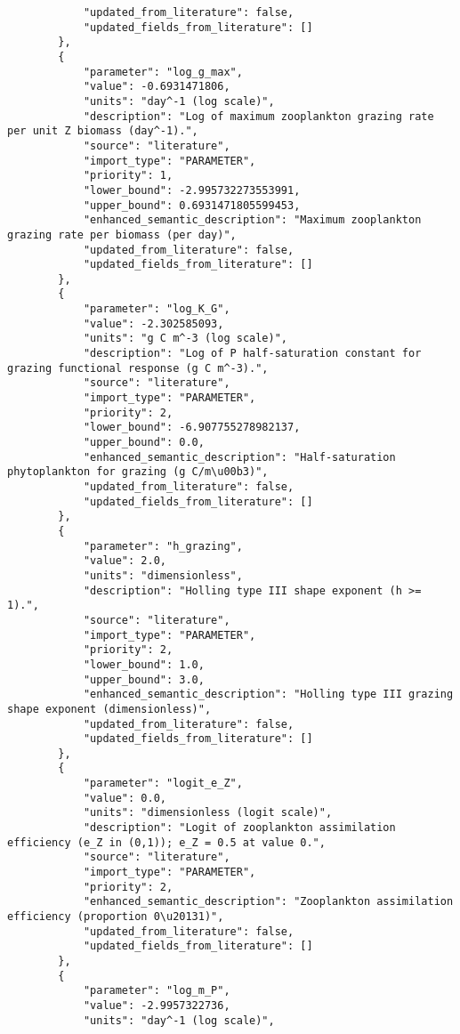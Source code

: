 \begin{lstlisting}
            "updated_from_literature": false,
            "updated_fields_from_literature": []
        },
        {
            "parameter": "log_g_max",
            "value": -0.6931471806,
            "units": "day^-1 (log scale)",
            "description": "Log of maximum zooplankton grazing rate per unit Z biomass (day^-1).",
            "source": "literature",
            "import_type": "PARAMETER",
            "priority": 1,
            "lower_bound": -2.995732273553991,
            "upper_bound": 0.6931471805599453,
            "enhanced_semantic_description": "Maximum zooplankton grazing rate per biomass (per day)",
            "updated_from_literature": false,
            "updated_fields_from_literature": []
        },
        {
            "parameter": "log_K_G",
            "value": -2.302585093,
            "units": "g C m^-3 (log scale)",
            "description": "Log of P half-saturation constant for grazing functional response (g C m^-3).",
            "source": "literature",
            "import_type": "PARAMETER",
            "priority": 2,
            "lower_bound": -6.907755278982137,
            "upper_bound": 0.0,
            "enhanced_semantic_description": "Half-saturation phytoplankton for grazing (g C/m\u00b3)",
            "updated_from_literature": false,
            "updated_fields_from_literature": []
        },
        {
            "parameter": "h_grazing",
            "value": 2.0,
            "units": "dimensionless",
            "description": "Holling type III shape exponent (h >= 1).",
            "source": "literature",
            "import_type": "PARAMETER",
            "priority": 2,
            "lower_bound": 1.0,
            "upper_bound": 3.0,
            "enhanced_semantic_description": "Holling type III grazing shape exponent (dimensionless)",
            "updated_from_literature": false,
            "updated_fields_from_literature": []
        },
        {
            "parameter": "logit_e_Z",
            "value": 0.0,
            "units": "dimensionless (logit scale)",
            "description": "Logit of zooplankton assimilation efficiency (e_Z in (0,1)); e_Z = 0.5 at value 0.",
            "source": "literature",
            "import_type": "PARAMETER",
            "priority": 2,
            "enhanced_semantic_description": "Zooplankton assimilation efficiency (proportion 0\u20131)",
            "updated_from_literature": false,
            "updated_fields_from_literature": []
        },
        {
            "parameter": "log_m_P",
            "value": -2.9957322736,
            "units": "day^-1 (log scale)",

\end{lstlisting}
